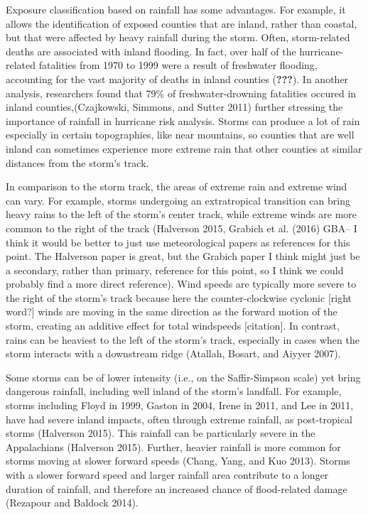 \documentclass[]{elsarticle} %
\begin{document}
Exposure classification based on rainfall has some advantages. For
example, it allows the identification of exposed counties that are
inland, rather than coastal, but that were affected by heavy rainfall
during the storm. Often, storm-related deaths are associated with inland
flooding. In fact, over half of the hurricane-related fatalities from
1970 to 1999 were a result of freshwater flooding, accounting for the
vast majority of deaths in inland counties ({\textbf{???}}). In another
analysis, researchers found that 79\% of freshwater-drowning fatalities
occured in inland counties,(Czajkowski, Simmons, and Sutter 2011)
further stressing the importance of rainfall in hurricane risk analysis.
Storms can produce a lot of rain especially in certain topographies,
like near mountains, so counties that are well inland can sometimes
experience more extreme rain that other counties at similar distances
from the storm's track.

In comparison to the storm track, the areas of extreme rain and extreme
wind can vary. For example, storms undergoing an extratropical
transition can bring heavy rains to the left of the storm's center
track, while extreme winds are more common to the right of the track
(Halverson 2015, Grabich et al. (2016) GBA-- I think it would be better
to just use meteorological papers as references for this point. The
Halverson paper is great, but the Grabich paper I think might just be a
secondary, rather than primary, reference for this point, so I think we
could probably find a more direct reference). Wind speeds are typically
more severe to the right of the storm's track because here the
counter-clockwise cyclonic {[}right word?{]} winds are moving in the
same direction as the forward motion of the storm, creating an additive
effect for total windspeeds {[}citation{]}. In contrast, rains can be
heaviest to the left of the storm's track, especially in cases when the
storm interacts with a downstream ridge (Atallah, Bosart, and Aiyyer
2007).

Some storms can be of lower intensity (i.e., on the Saffir-Simpson
scale) yet bring dangerous rainfall, including well inland of the
storm's landfall. For example, storms including Floyd in 1999, Gaston in
2004, Irene in 2011, and Lee in 2011, have had severe inland impacts,
often through extreme rainfall, as post-tropical storms (Halverson
2015). This rainfall can be particularly severe in the Appalachians
(Halverson 2015). Further, heavier rainfall is more common for storms
moving at slower forward speeds (Chang, Yang, and Kuo 2013). Storms with
a slower forward speed and larger rainfall area contribute to a longer
duration of rainfall, and therefore an increased chance of flood-related
damage (Rezapour and Baldock 2014).
\end{document}
